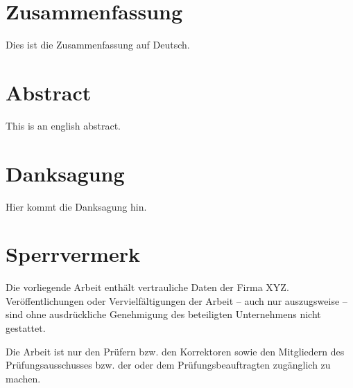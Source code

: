 
\clearpage
\customtitlebackpage



\cleardoublepage
\begin{minipage}{\linewidth}

\chapter*{Zusammenfassung}
Dies ist die Zusammenfassung auf Deutsch.

\chapter*{Abstract}
This is an english abstract.

\end{minipage}
\cleardoublepage



\chapter*{Danksagung}
Hier kommt die Danksagung hin.



\chapter*{Sperrvermerk}
Die vorliegende Arbeit enthält vertrauliche Daten der Firma XYZ. Veröffentlichungen
oder Vervielfältigungen der Arbeit -- auch nur auszugsweise -- sind ohne ausdrückliche
Genehmigung des beteiligten Unternehmens nicht gestattet.

Die Arbeit ist nur den Prüfern bzw. den Korrektoren sowie den Mitgliedern des
Prüfungsausschusses bzw. der oder dem Prüfungsbeauftragten zugänglich zu machen.



\cleardoublepage



